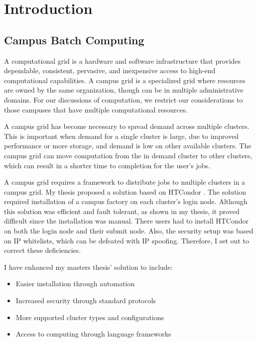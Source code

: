 \chapter{Introduction}

\section{Campus Batch Computing}

A computational grid is a hardware and software infrastructure that provides dependable, consistent, pervasive, and inexpensive access to high-end computational capabilities\cite{foster2004grid}.  A campus grid is a specialized grid where resources are owned by the same organization, though can be in multiple administrative domains.  For our discussions of computation, we restrict our considerations to those campuses that have multiple computational resources.

A campus grid has become necessary to spread demand across multiple clusters.  This is important when demand for a single cluster is large, due to improved performance or more storage, and demand is low on other available clusters.  The campus grid can move computation from the in demand cluster to other clusters, which can result in a shorter time to completion for the user's jobs.

A campus grid requires a framework to distribute jobs to multiple clusters in a campus grid.  My thesis \cite{weitzel2011campus} proposed a solution based on HTCondor \cite{litzkow1988condor}.  The solution required installation of a campus factory \cite{TODO: campus factory} on each cluster's login node.  Although this solution was efficient and fault tolerant, as shown in my thesis, it proved difficult since the installation was manual.  There users had to install HTCondor on both the login node and their submit node.  Also, the security setup was based on IP whitelists, which can be defeated with IP spoofing.  Therefore, I set out to correct these deficiencies.

I have enhanced my masters thesis' solution to include:
\begin{itemize}
\item Easier installation through automation
\item Increased security through standard protocols
\item More supported cluster types and configurations
\item Access to computing through language frameworks
\end{itemize}

